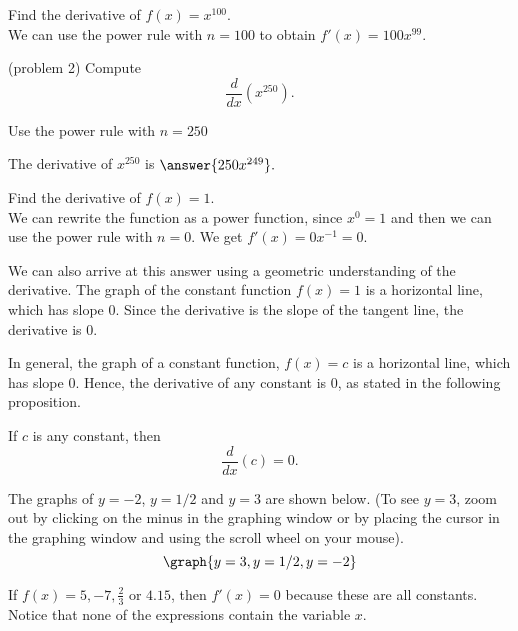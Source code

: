 \documentclass{ximera}
\begin{document}
\begin{example}[example 2]
Find the derivative of $f(x) = x^{100}$.\\
We can use the power rule with $n = 100$ to obtain $f'(x) = 100x^{99}.$
\end{example}

\begin{problem}(problem 2)
Compute
\[
\frac{d}{dx} \left(x^{250}\right).
\]
\begin{hint}
Use the power rule with $n = 250$
\end{hint}
The derivative of $x^{250}$ is $\answer{250x^{249}}.$
\end{problem}



\begin{example}[example 3]
Find the derivative of $f(x) = 1$.\\
We can rewrite the function as a power function, since $x^0 = 1$ and then we can use the power rule with $n=0$. We get $f'(x) = 0x^{-1} = 0$. 

\begin{remark}
We can also arrive at this answer using a geometric understanding of the derivative.
The graph of the constant function $f(x) = 1$ is a horizontal line, which has slope 0. 
Since the derivative is the slope of the tangent line, the derivative is 0.
\end{remark}
\end{example}


In general, the graph of a constant function, $f(x) = c$ is a horizontal line, which has slope 0.
Hence, the derivative of any constant is 0, as stated in the following proposition.

\begin{proposition}
If $c$ is any constant, then
\[
\frac{d}{dx} \left(c\right) = 0.
\]
\end{proposition}


The graphs of $y = -2$, $y = 1/2$ and $y = 3$ are shown below.
(To see $y=3$, zoom out by clicking on the minus in the graphing window or 
by placing the cursor in the graphing window and using the scroll wheel on your mouse).
\[
\graph{y = 3, y = 1/2, y = -2}
\]



\begin{example}[example 4]
If $f(x) = 5, -7, \frac23$ or $4.15$, then $f'(x) = 0$ 
because these are all constants. Notice that none of the expressions contain the variable $x$.
\end{example}
\end{document}
